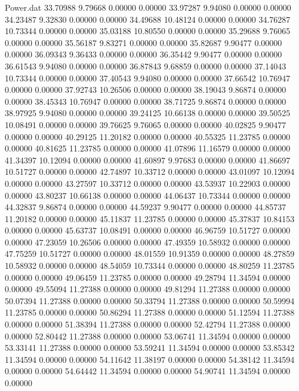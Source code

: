 \begin{filecontents}{Power.dat}
  33.70988    9.79668    0.00000    0.00000
  33.97287    9.94080    0.00000    0.00000
  34.23487    9.32830    0.00000    0.00000
  34.49688   10.48124    0.00000    0.00000
  34.76287   10.73344    0.00000    0.00000
  35.03188   10.80550    0.00000    0.00000
  35.29688    9.76065    0.00000    0.00000
  35.56187    9.83271    0.00000    0.00000
  35.82687    9.90477    0.00000    0.00000
  36.09343    9.36433    0.00000    0.00000
  36.35442    9.90477    0.00000    0.00000
  36.61543    9.94080    0.00000    0.00000
  36.87843    9.68859    0.00000    0.00000
  37.14043   10.73344    0.00000    0.00000
  37.40543    9.94080    0.00000    0.00000
  37.66542   10.76947    0.00000    0.00000
  37.92743   10.26506    0.00000    0.00000
  38.19043    9.86874    0.00000    0.00000
  38.45343   10.76947    0.00000    0.00000
  38.71725    9.86874    0.00000    0.00000
  38.97925    9.94080    0.00000    0.00000
  39.24125   10.66138    0.00000    0.00000
  39.50525   10.08491    0.00000    0.00000
  39.76625    9.76065    0.00000    0.00000
  40.02825    9.90477    0.00000    0.00000
  40.29125   11.20182    0.00000    0.00000
  40.55325   11.23785    0.00000    0.00000
  40.81625   11.23785    0.00000    0.00000
  41.07896   11.16579    0.00000    0.00000
  41.34397   10.12094    0.00000    0.00000
  41.60897    9.97683    0.00000    0.00000
  41.86697   10.51727    0.00000    0.00000
  42.74897   10.33712    0.00000    0.00000
  43.01097   10.12094    0.00000    0.00000
  43.27597   10.33712    0.00000    0.00000
  43.53937   10.22903    0.00000    0.00000
  43.80237   10.66138    0.00000    0.00000
  44.06437   10.73344    0.00000    0.00000
  44.32837    9.86874    0.00000    0.00000
  44.59237    9.90477    0.00000    0.00000
  44.85737   11.20182    0.00000    0.00000
  45.11837   11.23785    0.00000    0.00000
  45.37837   10.84153    0.00000    0.00000
  45.63737   10.08491    0.00000    0.00000
  46.96759   10.51727    0.00000    0.00000
  47.23059   10.26506    0.00000    0.00000
  47.49359   10.58932    0.00000    0.00000
  47.75259   10.51727    0.00000    0.00000
  48.01559   10.91359    0.00000    0.00000
  48.27859   10.58932    0.00000    0.00000
  48.54059   10.73344    0.00000    0.00000
  48.80259   11.23785    0.00000    0.00000
  49.06459   11.23785    0.00000    0.00000
  49.28794   11.34594    0.00000    0.00000
  49.55094   11.27388    0.00000    0.00000
  49.81294   11.27388    0.00000    0.00000
  50.07394   11.27388    0.00000    0.00000
  50.33794   11.27388    0.00000    0.00000
  50.59994   11.23785    0.00000    0.00000
  50.86294   11.27388    0.00000    0.00000
  51.12594   11.27388    0.00000    0.00000
  51.38394   11.27388    0.00000    0.00000
  52.42794   11.27388    0.00000    0.00000
  52.80442   11.27388    0.00000    0.00000
  53.06741   11.34594    0.00000    0.00000
  53.33141   11.27388    0.00000    0.00000
  53.59241   11.34594    0.00000    0.00000
  53.85342   11.34594    0.00000    0.00000
  54.11642   11.38197    0.00000    0.00000
  54.38142   11.34594    0.00000    0.00000
  54.64442   11.34594    0.00000    0.00000
  54.90741   11.34594    0.00000    0.00000
\end{filecontents}